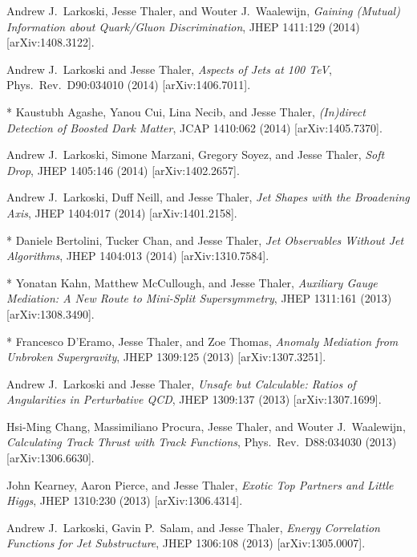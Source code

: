 \begin{list}{[]\addtocounter{jessecount}{-1}}{\leftmargin=3em \itemsep=4pt}
\item
 Andrew J.\ Larkoski, Jesse Thaler, and Wouter J.\ Waalewijn,
\emph{Gaining (Mutual) Information about Quark/Gluon Discrimination},
JHEP 1411:129 (2014)
[arXiv:1408.3122].

\item
 Andrew J.\ Larkoski and Jesse Thaler,
\emph{Aspects of Jets at 100 TeV},
Phys.\ Rev.\ D90:034010 (2014)
[arXiv:1406.7011].

\item
* Kaustubh Agashe, Yanou Cui, Lina Necib, and Jesse Thaler,
\emph{(In)direct Detection of Boosted Dark Matter},
JCAP 1410:062 (2014)
[arXiv:1405.7370].

\item
 Andrew J.\ Larkoski, Simone Marzani, Gregory Soyez, and Jesse Thaler,
\emph{Soft Drop},
JHEP 1405:146 (2014)
[arXiv:1402.2657].

\item
 Andrew J.\ Larkoski, Duff Neill, and Jesse Thaler,
\emph{Jet Shapes with the Broadening Axis},
JHEP 1404:017 (2014)
[arXiv:1401.2158].

\item
* Daniele Bertolini, Tucker Chan, and Jesse Thaler,
\emph{Jet Observables Without Jet Algorithms},
JHEP 1404:013 (2014)
[arXiv:1310.7584].

\item
* Yonatan Kahn, Matthew McCullough, and Jesse Thaler,
\emph{Auxiliary Gauge Mediation: A New Route to Mini-Split Supersymmetry},
JHEP 1311:161 (2013)
[arXiv:1308.3490].

\item
* Francesco D'Eramo, Jesse Thaler, and Zoe Thomas,
\emph{Anomaly Mediation from Unbroken Supergravity},
JHEP 1309:125 (2013)
[arXiv:1307.3251].

\item
 Andrew J.\ Larkoski and Jesse Thaler,
\emph{Unsafe but Calculable: Ratios of Angularities in Perturbative QCD},
JHEP 1309:137 (2013)
[arXiv:1307.1699].

\item
 Hsi-Ming Chang, Massimiliano Procura, Jesse Thaler, and Wouter J.\ Waalewijn,
\emph{Calculating Track Thrust with Track Functions},
Phys.\ Rev.\ D88:034030 (2013)
[arXiv:1306.6630].

\item
 John Kearney, Aaron Pierce, and Jesse Thaler,
\emph{Exotic Top Partners and Little Higgs},
JHEP 1310:230 (2013)
[arXiv:1306.4314].

\item
 Andrew J.\ Larkoski, Gavin P.\ Salam, and Jesse Thaler,
\emph{Energy Correlation Functions for Jet Substructure},
JHEP 1306:108 (2013)
[arXiv:1305.0007].


\end{list}
